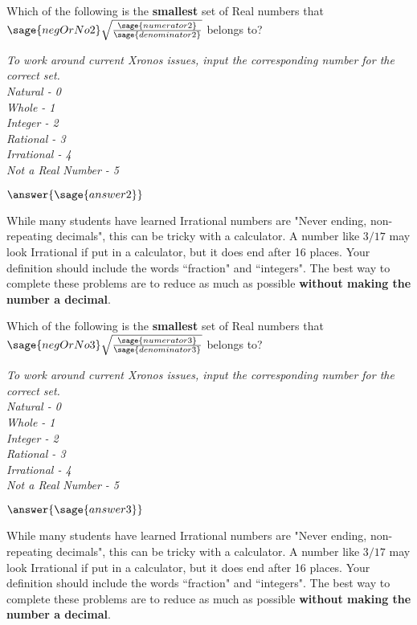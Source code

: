 \documentclass{ximera}
\begin{document}
\begin{exercise}
Which of the following is the \textbf{smallest} set of Real numbers that $\sage{negOrNo2} \sqrt{\frac{\sage{numerator2}}{\sage{denominator2}}} $ belongs to?

\textit{To work around current Xronos issues, input the corresponding number for the correct set. \\
Natural - 0 \\
Whole - 1 \\
Integer - 2 \\
Rational - 3 \\
Irrational - 4 \\
Not a Real Number - 5
}

$\answer{\sage{answer2}}$
\begin{hint}
While many students have learned Irrational numbers are "Never ending, non-repeating decimals", this can be tricky with a calculator. A number like $3/17$ may look Irrational if put in a calculator, but it does end after 16 places. Your definition should include the words ``fraction" and ``integers". The best way to complete these problems are to reduce as much as possible \textbf{without making the number a decimal}.
\end{hint}
\end{exercise}

\begin{exercise}
Which of the following is the \textbf{smallest} set of Real numbers that $\sage{negOrNo3} \sqrt{\frac{\sage{numerator3}}{\sage{denominator3}}} $ belongs to?

\textit{To work around current Xronos issues, input the corresponding number for the correct set. \\
Natural - 0 \\
Whole - 1 \\
Integer - 2 \\
Rational - 3 \\
Irrational - 4 \\
Not a Real Number - 5
}

$\answer{\sage{answer3}}$
\begin{hint}
While many students have learned Irrational numbers are "Never ending, non-repeating decimals", this can be tricky with a calculator. A number like $3/17$ may look Irrational if put in a calculator, but it does end after 16 places. Your definition should include the words ``fraction" and ``integers". The best way to complete these problems are to reduce as much as possible \textbf{without making the number a decimal}.
\end{hint}
\end{exercise}
\end{document}
